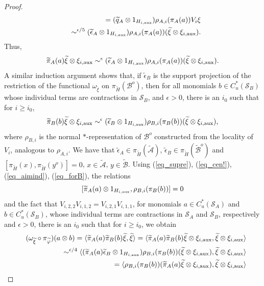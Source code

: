 \documentclass[11pt]{amsart}
\theoremstyle{definition}
\newcommand{\cl}[1]{\mathcal{#1}}
\providecommand{\wt}[1]{\widetilde{#1}}
\begin{document}
\begin{proof}
\begin{eqnarray*}
 && =
 (\wt{q}_A\otimes 1_{H_{i,\rm aux}})\rho_{A,i}(\pi_A(a))V_i\xi\\
 && \sim^{\epsilon/5}
 (\wt{\epsilon}_A\otimes 1_{H_{i,{\rm aux}}})\rho_{A,i}(\pi_A(a))(\wt{\xi}\otimes\xi_{i, {\rm aux}}).
\end{eqnarray*}
Thus, 
$$\wt{\pi}_A(a)\wt{\xi}\otimes\xi_{i,{\rm aux}} 
\sim^{\epsilon} (\wt{\epsilon}_A\otimes 1_{H_{i,{\rm aux}}})
\rho_{A,i}(\pi_A(a))(\wt{\xi}\otimes\xi_{i,{\rm aux}}).$$
A similar induction argument shows that, 
if $\wt{\epsilon}_B$ is the support projection of the restriction of  
the functional $\omega_{\wt{\xi}}$ on $\pi_{\wt{H}}(\cl B^o)$, then for all monomials $b\in C_u^*(\cl S_B)$ whose individual terms are contractions in $\cl S_B$, and $\epsilon>0$, there is an $i_0$ such that for $i\geq i_0$,
\begin{equation}\label{eq_forB}
\wt{\pi}_B(b)\wt{\xi}\otimes\xi_{i,{\rm aux}}
\sim^{\epsilon} 
(\wt{\epsilon}_B\otimes 1_{H_{i,{\rm aux}}})\rho_{B,i}(\pi_B(b))(\wt{\xi}\otimes\xi_{i,{\rm aux}}),
\end{equation}
where $\rho_{B,i}$ is the normal $*$-representation of $\cl B^o$ constructed from the locality of $V_i$, analogous to $\rho_{A,i}$.
We have that 
$\wt{\epsilon}_A\in \pi_{\wt{H}}(\wt{\cl A})$, $\wt{\epsilon}_B\in \pi_{\wt{H}}(\wt{\cl B}^o)$ and $[\pi_{\wt{H}}(x), \pi_{\wt{H}}(y^o)]=0$, $x\in \wt{\cl A}$, $y\in\wt{\cl B}$.
Using (\ref{eq_supre}), (\ref{eq_cen!}),  (\ref{eq_aimind}), (\ref{eq_forB}), the relations
$$[\wt{\pi}_A(a)\otimes 1_{H_{i,\rm aux}},\rho_{B,i}(\pi_{B}(b))] = 0$$ 
and the fact that $V_{i,2,2}V_{i,1,2} = V_{i,2,1}V_{i,1,1}$, 
for monomials $a\in C_u^*(\cl S_A)$ and $b\in C_u^*(\cl S_B)$, whose individual terms are contractions in $\cl S_A$ and $\cl S_B$, respectively and $\epsilon>0$, there is an $i_0$ such that for $i\geq i_0$, we obtain 
\begin{eqnarray*}
    &&
    (\omega_{\wt{\xi}}\circ\pi_{\wt{\varphi}})(a\otimes b)
    =
    \langle \wt{\pi}_A(a)\wt{\pi}_B(b)\wt{\xi},\wt{\xi}\rangle
    =
    \langle \wt{\pi}_A(a)\wt{\pi}_B(b)\wt{\xi}\otimes\xi_{i,{\rm aux}},\wt{\xi}\otimes\xi_{i,{\rm aux}}\rangle\\
    && \sim^{\epsilon/4}
    \langle (\wt{\pi}_A(a)\wt{\epsilon}_B\otimes 1_{H_{i,{\rm aux}}})\rho_{B,i}(\pi_B(b))(\wt{\xi}\otimes\xi_{i,{\rm aux}}), \wt{\xi}\otimes\xi_{i,{\rm aux}}\rangle\\
    && =
    \langle \rho_{B,i}(\pi_B(b))(\wt{\pi}_A(a)\wt{\xi}\otimes\xi_{i,{\rm aux}}), \wt{\xi}\otimes\xi_{i,{\rm aux}}\rangle\\

\end{eqnarray*}
\end{proof}
\end{document}
